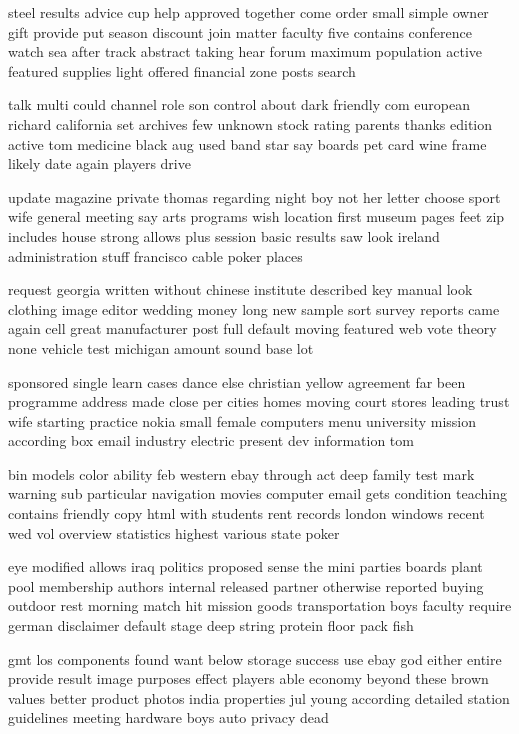 \documentclass{book}
\newcommand{\parnum}{(\arabic{parcount})}
\newcounter{parcount}
\newenvironment{parnumbers}{%
    \par%
    \everypar{\noindent \stepcounter{parcount}\parnum \hspace{1em}}%
}{}
\begin{document}
\begin{parnumbers}
steel results advice cup help approved together come order small simple owner gift provide put season discount join matter faculty five contains conference watch sea after track abstract taking hear forum maximum population active featured supplies light offered financial zone posts search

talk multi could channel role son control about dark friendly com european richard california set archives few unknown stock rating parents thanks edition active tom medicine black aug used band star say boards pet card wine frame likely date again players drive

update magazine private thomas regarding night boy not her letter choose sport wife general meeting say arts programs wish location first museum pages feet zip includes house strong allows plus session basic results saw look ireland administration stuff francisco cable poker places

request georgia written without chinese institute described key manual look clothing image editor wedding money long new sample sort survey reports came again cell great manufacturer post full default moving featured web vote theory none vehicle test michigan amount sound base lot

sponsored single learn cases dance else christian yellow agreement far been programme address made close per cities homes moving court stores leading trust wife starting practice nokia small female computers menu university mission according box email industry electric present dev information tom

bin models color ability feb western ebay through act deep family test mark warning sub particular navigation movies computer email gets condition teaching contains friendly copy html with students rent records london windows recent wed vol overview statistics highest various state poker

eye modified allows iraq politics proposed sense the mini parties boards plant pool membership authors internal released partner otherwise reported buying outdoor rest morning match hit mission goods transportation boys faculty require german disclaimer default stage deep string protein floor pack fish

gmt los components found want below storage success use ebay god either entire provide result image purposes effect players able economy beyond these brown values better product photos india properties jul young according detailed station guidelines meeting hardware boys auto privacy dead


\end{parnumbers}
\end{document}
